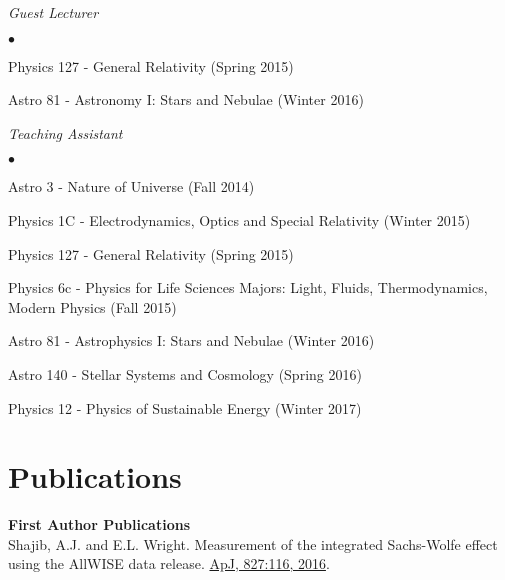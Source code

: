 \documentclass[margin,line]{res}
\newenvironment{list2}{
  \begin{list}{$\bullet$}{%
      \setlength{\itemsep}{0in}
      \setlength{\parsep}{0in} \setlength{\parskip}{0in}
      \setlength{\topsep}{0in} \setlength{\partopsep}{0in} 
      \setlength{\leftmargin}{0.2in}}}{\end{list}}
\begin{document}
\begin{resume}


{\em Guest Lecturer} \hfill {\bf}\\
\begin{list2}
	\item Physics 127 - General Relativity (Spring 2015)
	\item Astro 81 - Astronomy I: Stars and Nebulae (Winter 2016)
	\end{list2}
	
{\em Teaching Assistant} \hfill {}\\
\begin{list2}
	\item Astro 3 - Nature of Universe (Fall 2014)
	\item Physics 1C - Electrodynamics, Optics and Special Relativity (Winter 2015)
	\item Physics 127 - General Relativity (Spring 2015)
	\item Physics 6c - Physics for Life Sciences Majors: Light, Fluids, Thermodynamics, Modern Physics (Fall 2015)
	\item Astro 81 - Astrophysics I: Stars and Nebulae (Winter 2016)
	\item Astro 140 - Stellar Systems and Cosmology (Spring 2016)
	\item Physics 12 - Physics of Sustainable Energy (Winter 2017)
	\end{list2}



\section{\sc Publications}
\textbf{First Author Publications} \\
{Shajib, A.J.} and E.L. Wright. Measurement of the integrated Sachs-Wolfe effect using the AllWISE data release. \href{http://dx.doi.org/10.3847/0004-637X/827/2/116}{ApJ, 827:116, 2016}.


\end{resume}
\end{document}
